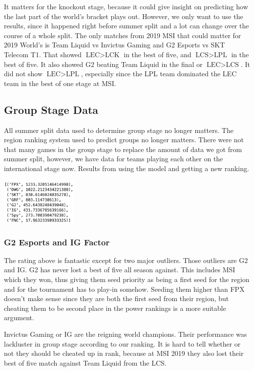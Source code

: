 \documentclass[11pt]{article}
\theoremstyle{plain}
\theoremstyle{definition}
\numberwithin{equation}{section}
\numberwithin{theorem}{section}
\numberwithin{lemma}{section}
\numberwithin{definition}{section}
\numberwithin{proposition}{section}
\numberwithin{corollary}{section}
\begin{document}
	
	It matters for the knockout stage, because it could give insight on predicting how the last part of the world's bracket plays out. However, we only want to use the results, since it happened right before summer split and a lot can change over the course of a whole split. The only matches from 2019 MSI that could matter for 2019 World's is Team Liquid vs Invictus Gaming and G2 Esports vs SKT Telecom T1. That showed $\text{LEC} > \text{LCK}$ in the best of five, and $\text{LCS} > \text{LPL}$ in the best of five. It also showed G2 beating Team Liquid in the final or $\text{LEC} > \text{LCS}$. It did not show $\text{LEC} > \text{LPL}$, especially since the LPL team dominated the LEC team in the best of one stage at MSI.

\subsection{Group Stage Data}
	All summer split data used to determine group stage no longer matters. The region ranking system used to predict groups no longer matters. There were not that many games in the group stage to replace the amount of data we got from summer split, however, we have data for teams playing each other on the international stage now. Results from using the model and getting a new ranking.
	
	\begin{center}
		\includegraphics[width=1.5in]{BeforeSeed}
	\end{center}

\subsubsection{G2 Esports and IG Factor}
	The rating above is fantastic except for two major outliers. Those outliers are G2 and IG. G2 has never lost a best of five all season against. This includes MSI which they won, thus giving them seed priority as being a first seed for the region and for the tournament has to play-in somehow. Seeding them higher than FPX doesn't make sense since they are both the first seed from their region, but cheating them to be second place in the power rankings is a more suitable argument.
	
	
	Invictus Gaming or IG are the reigning world champions. Their performance was lackluster in group stage according to our ranking. It is hard to tell whether or not they should be cheated up in rank, because at MSI 2019 they also lost their best of five match against Team Liquid from the LCS.
	
\end{document}

